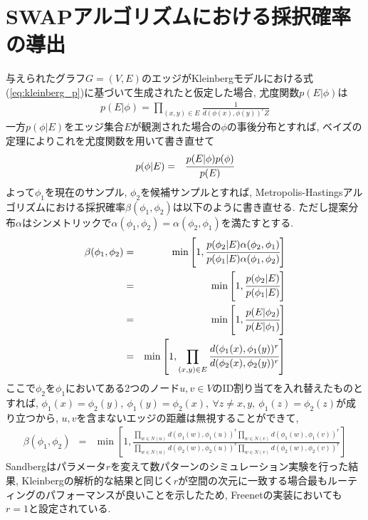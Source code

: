 \documentclass[dvipdfmx]{ampbt}
\begin{document}
\section{SWAPアルゴリズムにおける採択確率の導出}
   与えられたグラフ$G=(V,E)$のエッジがKleinbergモデルにおける式(\ref{eq:kleinberg_p})に基づいて生成されたと仮定した場合, 尤度関数$p(E|\phi)$は
   \begin{eqnarray*}
    p(E|\phi) = \prod_{(x,y) \in E}\frac{1}{d(\phi(x), \phi(y))^rZ}
   \end{eqnarray*}
   一方$p(\phi|E)$をエッジ集合$E$が観測された場合の$\phi$の事後分布とすれば, ベイズの定理によりこれを尤度関数を用いて書き直せて
   \begin{eqnarray*}
    p(\phi|E) &=&\cfrac{p(E|\phi)p(\phi)}{p(E)} \label{eq:posteri}
   \end{eqnarray*}
   よって$\phi_1$を現在のサンプル, $\phi_2$を候補サンプルとすれば, Metropolis-Hastingsアルゴリズムにおける採択確率$\beta(\phi_1,\phi_2)$は以下のように書き直せる. ただし提案分布$\alpha$はシンメトリックで$\alpha(\phi_1, \phi_2 ) = \alpha(\phi_2, \phi_1 )$を満たすとする. 
   \begin{eqnarray*}
    \beta (\phi_1, \phi_2) &=& \min \left[1, \cfrac{p(\phi_2|E)\alpha(\phi_2, \phi_1)}{p(\phi_1|E)\alpha(\phi_1, \phi_2)}\right] \\
                           &=& \min \left[1, \cfrac{p(\phi_2|E)}{p(\phi_1|E)}\right] \\
                           &=& \min \left[1, \cfrac{p(E|\phi_2)}{p(E|\phi_1)}\right] \\
    &=& \min \left[1, \prod_{(x,y) \in E}\cfrac{d(\phi_1(x), \phi_1(y))^r}{d(\phi_2(x), \phi_2(y))^r}\right] \\
   \end{eqnarray*}
ここで$\phi_2$を$\phi_1$においてある2つのノード$u,v \in V$のID割り当てを入れ替えたものとすれば, $\phi_1(x)=\phi_2 (y),\ \phi_1(y)=\phi_2 (x),\ \forall z \neq x, y,\ \phi_1(z)=\phi_2(z)$が成り立つから, $u,v$を含まないエッジの距離は無視することができて, 
\begin{eqnarray*}
     \beta(\phi_1, \phi_2)&=&\min \left[1, \frac{\prod_{w \in N(u)}d(\phi_1(w), \phi_1(u))^r\prod_{w \in N(v)}d(\phi_1(w), \phi_1(v))^r}{\prod_{w \in N(u)}d(\phi_2(w), \phi_2(u))^r\prod_{w \in N(v)}d(\phi_2(w), \phi_2(v))^r}\right] 
\end{eqnarray*}
Sandbergはパラメータ$r$を変えて数パターンのシミュレーション実験を行った結果, Kleinbergの解析的な結果と同じく$r$が空間の次元に一致する場合最もルーティングのパフォーマンスが良いことを示したため, Freenetの実装においても$r=1$と設定されている. 
\end{document}
